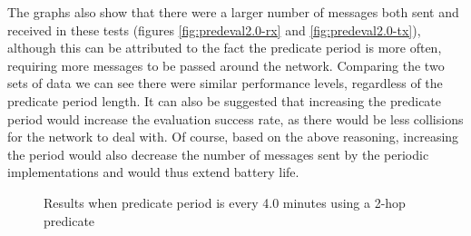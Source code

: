 The graphs also show that there were a larger number of messages both sent and received in these tests (figures \autoref{fig:predeval2.0-rx} and \autoref{fig:predeval2.0-tx}), although this can be attributed to the fact the predicate period is more often, requiring more messages to be passed around the network. Comparing the two sets of data we can see there were similar performance levels, regardless of the predicate period length. It can also be suggested that increasing the predicate period would increase the evaluation success rate, as there would be less collisions for the network to deal with. Of course, based on the above reasoning, increasing the period would also decrease the number of messages sent by the periodic implementations and would thus extend battery life.

\begin{figure}[H]
\centering
{}

\caption{Results when predicate period is every 4.0 minutes using a 2-hop predicate}
\label{fig:predeval-2hop-4.0}
\label{fig:predeval2hop}
\end{figure}

